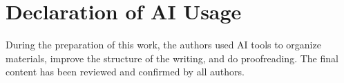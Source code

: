 \documentclass[sigconf,review,anonymous]{acmart}
\begin{document}
\section{Declaration of AI Usage}

During the preparation of this work, the authors used AI tools to organize materials, improve the structure of the writing, and do proofreading. The final content has been reviewed and confirmed by all authors.





\end{document}
